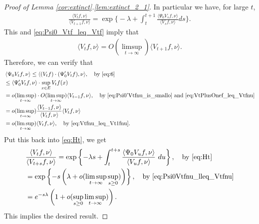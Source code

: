\documentclass[12pt,a4paper]{amsart}
\numberwithin{equation}{section}
\theoremstyle{plain}
\theoremstyle{definition}
\begin{document}
\begin{proof}[Proof of Lemma \ref{cor:extinct}.\eqref{lem:extinct_2_1}]
In particular we have, for large $t$,
\begin{align}
\label{eq:the_magic_formula}
\frac{\langle V_tf,\nu\rangle}{\langle V_{t+1}f,\nu\rangle}
=\exp\Big\{-\lambda+\int_{t}^{t+1}\frac{\langle \Psi_0V_sf,\nu\rangle}{\langle V_sf,\nu\rangle}ds\Big\}.
\end{align}
This and \eqref{eq:Psi0_Vtf_leq_Vtf} imply that
\begin{align}
\label{eq:Vtfnu_leq_Vt1fnu}
\langle V_tf,\nu\rangle = O(\limsup_{t\to \infty}) \langle V_{t+1} f,\nu \rangle.
\end{align}
Therefore, we can verify that
\begin{align}
\label{eq:Psi0vt_is_integrable}
&\left\langle \Psi_0 V_tf, \nu \right\rangle 
\leq \langle (V_tf) \cdot (\Psi'_0 V_tf), \nu \rangle,\quad\text{by~\eqref{eq:6}}
\\& \leq \langle \Psi'_0 V_tf,\nu\rangle  \cdot \sup_{x\in E} V_tf(x)
\\&= o(\limsup_{t\to \infty}) \cdot O(\limsup_{t\to \infty}) \langle V_{t-1}f,\nu\rangle,\quad\text{by~\eqref{eq:Psi0'Vtfnu_is_smallo} and \eqref{eq:VtPlusOnef_leq_Vtfnu}}
  \\&= o(\limsup_{t\to \infty}) \frac{\langle V_{t-1}f,\nu \rangle}{\langle V_{t}f ,\nu \rangle} \langle V_tf,\nu \rangle 
  \\& = o(\limsup_{t\to \infty})\langle V_tf,\nu \rangle,\quad\text{by~\eqref{eq:Vtfnu_leq_Vt1fnu}}. \label{eq:Psi0Vtfnu_lleq_Vtfnu}
\end{align}
Put this back into \eqref{eq:Ht}, we get
\begin{align}
&\frac{\langle V_tf,\nu\rangle}{\langle V_{t+s}f,\nu\rangle}
                = \exp \left\{-\lambda s+  \int_t^{t+s} \frac{\left\langle \Psi_0 V_u f,\nu \right\rangle}{ \left\langle V_uf, \nu \right\rangle } ~du \right\},\quad\text{by~\eqref{eq:Ht}}
  \\&=\exp\left\{-s\left(\lambda+o(\limsup_{t\to \infty} \sup_{s \geq  0})\right)\right\},\quad\text{by~\eqref{eq:Psi0Vtfnu_lleq_Vtfnu}}
\\ &= e^{-s\lambda} \left( 1+o(\sup_{s \geq 0}\limsup_{t\to \infty}) \right). 
     \label{eq:compare_with_Vtfnu_and_VtPlussfnu}
\end{align}
This implies the desired result.
\end{proof}
\end{document}
